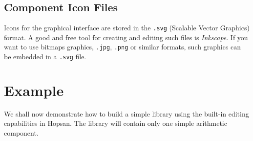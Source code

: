 \documentclass[a4paper,pdftex]{article}
\begin{document}
\subsection*{Component Icon Files}
Icons for the graphical interface are stored in the \texttt{.svg} (Scalable Vector Graphics) format. A good and free tool for creating and editing such files is \textit{Inkscape}. If you want to use bitmaps graphics, \texttt{.jpg}, \texttt{.png} or similar formats, such graphics can be embedded in a \texttt{.svg} file.

\section*{Example}
We shall now demonstrate how to build a simple library using the built-in editing capabilities in Hopsan. The library will contain only one simple arithmetic component.
\end{document}
